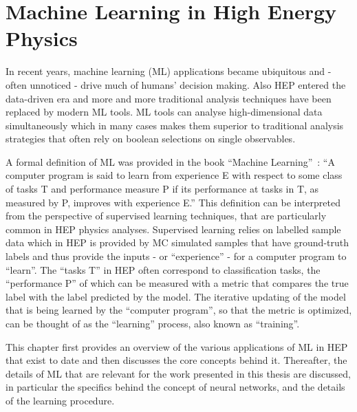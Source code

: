 





\chapter{Machine Learning in High Energy Physics}
\label{chap:ml}

In recent years, machine learning (ML) applications became ubiquitous and - often unnoticed - drive much of humans' decision making. 
Also HEP entered the data-driven era and more and more traditional analysis techniques have been replaced by modern ML tools.
ML tools can analyse high-dimensional data simultaneously which in many cases makes them superior to traditional analysis strategies that often rely on boolean selections on single observables. 

A formal definition of ML was provided in the book ``Machine Learning''~:
``A computer program is said to learn from experience E with respect to some class of tasks T and performance measure P if its performance at tasks in T, as measured by P, improves with experience E.''
This definition can be interpreted from the perspective of supervised learning techniques, that are particularly common in HEP physics analyses. 
Supervised learning relies on labelled sample data which in HEP is provided by MC simulated samples that have ground-truth labels and thus provide the inputs - or ``experience'' - for a computer program to ``learn''.
The ``tasks T'' in HEP often correspond to classification tasks, the ``performance P'' of which can be measured with a metric that compares the true label with the label predicted by the model. 
The iterative updating of the model that is being learned by the ``computer program'', so that the metric is optimized, can be thought of as the ``learning'' process, also known as ``training''. 

This chapter first provides an overview of the various applications of ML in HEP that exist to date and then discusses the core concepts behind it. Thereafter, the details of ML that are relevant for the work presented in this thesis are discussed, in particular the specifics behind the concept of neural networks, and the details of the learning procedure.

